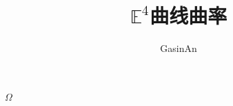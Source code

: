 \documentclass[12pt]{ctexart}
\title{$\mathbb{E}^4$曲线曲率}
\author{GasinAn}
\begin{document}
$\varOmega$
\end{document}
